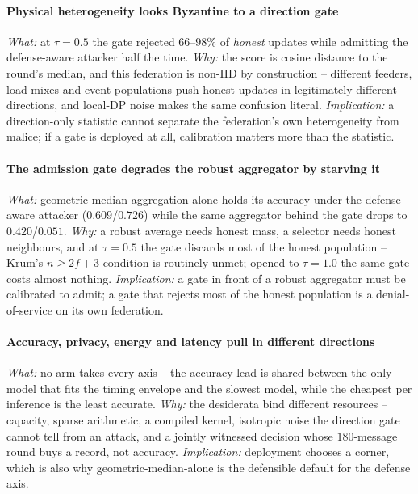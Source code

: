 \paragraph{Physical heterogeneity looks Byzantine to a direction gate}
\emph{What:} at $\tau=0.5$ the gate rejected $66$--$98\%$ of
\emph{honest} updates while admitting the defense-aware attacker half
the time. \emph{Why:} the score is cosine distance to the round's
median, and this federation is non-IID by construction -- different
feeders, load mixes and event populations push honest updates in
legitimately different directions, and local-DP noise makes the same
confusion literal. \emph{Implication:} a direction-only statistic cannot
separate the federation's own heterogeneity from malice; if a gate is
deployed at all, calibration matters more than the statistic.

\paragraph{The admission gate degrades the robust aggregator by
starving it}
\emph{What:} geometric-median aggregation alone holds its accuracy under
the defense-aware attacker ($0.609$/$0.726$) while the same aggregator
behind the gate drops to $0.420$/$0.051$. \emph{Why:} a robust average
needs honest mass, a selector needs honest neighbours, and at
$\tau=0.5$ the gate discards most of the honest population -- Krum's
$n \ge 2f+3$ condition is routinely unmet; opened to $\tau=1.0$ the
same gate costs almost nothing. \emph{Implication:} a gate in front of a
robust aggregator must be calibrated to admit; a gate that rejects most
of the honest population is a denial-of-service on its own federation.

\paragraph{Accuracy, privacy, energy and latency pull in different
directions}
\emph{What:} no arm takes every axis -- the accuracy lead is shared
between the only model that fits the timing envelope and the slowest
model, while the cheapest per inference is the least accurate.
\emph{Why:} the desiderata bind different resources -- capacity, sparse
arithmetic, a compiled kernel, isotropic noise the direction gate cannot
tell from an attack, and a jointly witnessed decision whose
$180$-message round buys a record, not accuracy. \emph{Implication:}
deployment chooses a corner, which is also why geometric-median-alone is
the defensible default for the defense axis.

